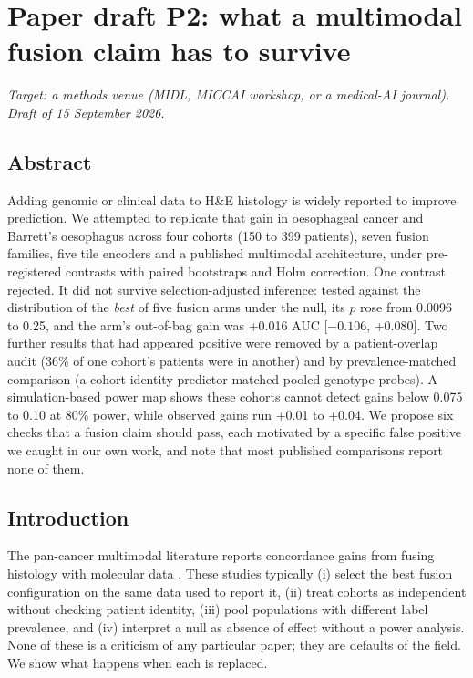 \chapter{Paper draft P2: what a multimodal fusion claim has to survive}
\label{app:p2}

\noindent\emph{Target: a methods venue (MIDL, MICCAI workshop, or a medical-AI journal). Draft of 15 September 2026.}

\section*{Abstract}
Adding genomic or clinical data to H\&E histology is widely reported to improve prediction. We attempted to replicate that gain in oesophageal cancer and Barrett's oesophagus across four cohorts (150 to 399 patients), seven fusion families, five tile encoders and a published multimodal architecture, under pre-registered contrasts with paired bootstraps and Holm correction. One contrast rejected. It did not survive selection-adjusted inference: tested against the distribution of the \emph{best} of five fusion arms under the null, its $p$ rose from 0.0096 to 0.25, and the arm's out-of-bag gain was +0.016 AUC [$-0.106$, +0.080]. Two further results that had appeared positive were removed by a patient-overlap audit (36\% of one cohort's patients were in another) and by prevalence-matched comparison (a cohort-identity predictor matched pooled genotype probes). A simulation-based power map shows these cohorts cannot detect gains below 0.075 to 0.10 at 80\% power, while observed gains run +0.01 to +0.04. We propose six checks that a fusion claim should pass, each motivated by a specific false positive we caught in our own work, and note that most published comparisons report none of them.

\section{Introduction}
The pan-cancer multimodal literature reports concordance gains from fusing histology with molecular data \citep{chen2022porpoise}. These studies typically (i) select the best fusion configuration on the same data used to report it, (ii) treat cohorts as independent without checking patient identity, (iii) pool populations with different label prevalence, and (iv) interpret a null as absence of effect without a power analysis. None of these is a criticism of any particular paper; they are defaults of the field. We show what happens when each is replaced.

